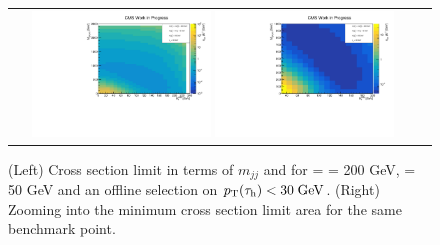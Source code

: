 \begin{figure}[tbh!]
	\centering
	\begin{tabular}{cc}
		\includegraphics[width=0.45\textwidth]{analysis/pics/JetInvMass_vs_MET_xsec_chi200_lsp050_taupt30.pdf}
		\includegraphics[width=0.45\textwidth]{analysis/pics/JetInvMass_vs_MET_xsec_chi200_lsp050_taupt30_zoom.pdf} 		
	\end{tabular}
	\caption{(Left) Cross section limit in terms of $m_{jj}$ and \met for \charginopm = \neutralinotwo = 200 GeV, \neutralinoone = 50 GeV and an offline selection on $p_{\text{T}}(\tau_{\text{h}}) <  30\;\text{Ge}\kern-0.06667em\text{V}$. (Right) Zooming into the minimum cross section limit area for the same benchmark point.}
	\label{fig::JetInvMass_vs_MET_xsec_chi200_lsp050_taupt30}
\end{figure}

